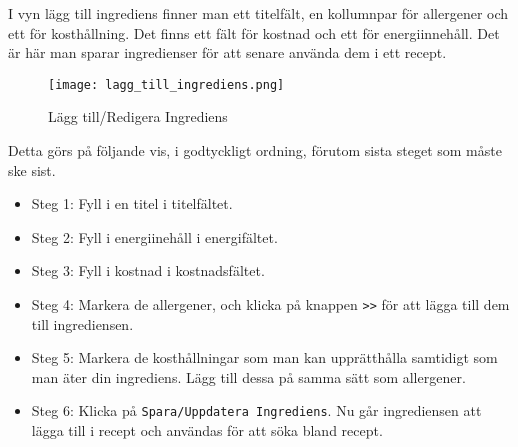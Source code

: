 I vyn lägg till ingrediens finner man ett titelfält, en kollumnpar för allergener och ett för kosthållning. Det finns ett fält för kostnad och ett för energiinnehåll. Det är här man sparar ingredienser för att senare använda dem i ett recept.

\begin{figure}[H]
        \centering 
        \texttt{[image: lagg\_till\_ingrediens.png]} 
        \caption{Lägg till/Redigera Ingrediens} 
        \label{fig:laggtillingrediensvyn}
\end{figure} 

Detta görs på följande vis, i godtyckligt ordning, förutom sista steget som måste ske sist. 

\begin{itemize}
\item Steg 1: Fyll i en titel i titelfältet.
\item Steg 2: Fyll i energiinehåll i energifältet.
\item Steg 3: Fyll i kostnad i kostnadsfältet. 
\item Steg 4: Markera de allergener, och klicka på knappen \verb+>>+ för att lägga till dem till ingrediensen. 
\item Steg 5: Markera de kosthållningar som man kan upprätthålla samtidigt som man äter din ingrediens. Lägg till dessa på samma sätt som allergener.
\item Steg 6: Klicka på \verb+Spara/Uppdatera Ingrediens+. Nu går ingrediensen att lägga till i recept och användas för att söka bland recept.
\end{itemize}


